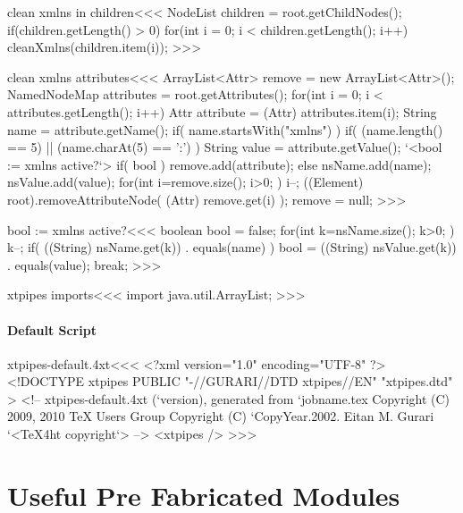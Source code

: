\documentclass{article}
\begin{document}
\<clean xmlns in children\><<<
NodeList children = root.getChildNodes();
if(children.getLength() > 0) {
   for(int i = 0; i < children.getLength(); i++) {
      cleanXmlns(children.item(i));
}  }
>>>

\<clean xmlns attributes\><<<
ArrayList<Attr> remove = new ArrayList<Attr>();
NamedNodeMap attributes = root.getAttributes();
for(int i = 0; i < attributes.getLength(); i++) {
   Attr attribute = (Attr) attributes.item(i);
   String name = attribute.getName();
   if( name.startsWith("xmlns") ){
     if( (name.length() == 5) || (name.charAt(5) == ':') ){
        String value = attribute.getValue();
        `<bool := xmlns active?`>
        if( bool ){ remove.add(attribute);
        } else { nsName.add(name); nsValue.add(value); }
}  } }
for(int i=remove.size(); i>0; ){
   i--;
  ((Element) root).removeAttributeNode( (Attr) remove.get(i) );
}
remove = null;
>>>

\<bool := xmlns active?\><<<
boolean bool = false;
for(int k=nsName.size(); k>0; ){
  k--;
  if( ((String) nsName.get(k)) . equals(name) ){
     bool = ((String) nsValue.get(k)) . equals(value);
     break;
} }
>>>

\<xtpipes imports\><<<
import java.util.ArrayList;
>>>



\subsection{Default Script}

\expandafter\AddFile{}

\<xtpipes-default.4xt\><<<
<?xml version="1.0" encoding="UTF-8" ?>
<!DOCTYPE xtpipes PUBLIC "-//GURARI//DTD xtpipes//EN" "xtpipes.dtd"  >
<!-- xtpipes-default.4xt (`version), generated from `jobname.tex
     Copyright (C) 2009, 2010 TeX Users Group
     Copyright (C) `CopyYear.2002. Eitan M. Gurari
`<TeX4ht copyright`> -->
<xtpipes />
>>>












\part{Useful Pre Fabricated Modules}
\end{document}
